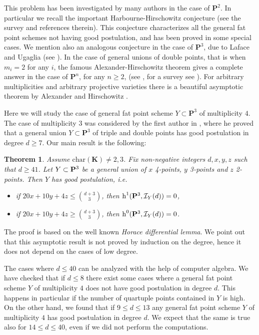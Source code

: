 \documentclass{amsart}
\theoremstyle{plain}
\newtheorem{theorem}{Theorem}
\theoremstyle{definition}
\begin{document}
This problem has been investigated by many authors in the case of ${\mathbf P}^2$.
In particular we recall the important Harbourne-Hirschowitz conjecture
(see the survey \cite{ciliberto} and references therein). This conjecture characterizes all the
general fat point schemes not having good postulation, and has been
proved in some special cases.
We mention also an analogous conjecture in the case of ${\mathbf P}^3$,
due to Laface and Ugaglia (see \cite{laface-ugaglia}).
In the case of general unions of double points, that is when $m_i=2$ for any $i$,
the famous Alexander-Hirschowitz theorem gives a
complete answer in the case of ${\mathbf P}^n$, for any $n\ge 2$,
(see  \cite{AHinv,AHjag}, for a survey see \cite{BO}).
For arbitrary multiplicities and arbitrary projective
varieties there is a beautiful asymptotic theorem by
Alexander and Hirschowitz \cite{AH}.

Here we will study the case of general fat point scheme
$Y\subset{\mathbf P}^3$ of multiplicity $4$. The case of multiplicity $3$
was considered by the first author in \cite{ballico-tripli}, where
he proved that a general union $Y \subset {\mathbf P}^3$ of triple and
double points has good postulation in degree $d\ge7$.
\newpage
Our main result is the following:

\begin{theorem}\label{i1}
Assume $\textrm{char}(\mathbf{K})\neq 2,3$.
Fix non-negative integers $d, x, y, z$ such that $d \ge 41$.
Let $Y \subset {\bf {P}}^3$
be a general union of $x$ 4-points, $y$ 3-points and $z$
2-points. Then $Y$ has good postulation, i.e.
\begin{itemize}
\item
if $20x + 10y+4z \le \binom{d+3}{3}$,
then $\operatorname{h}^1({\bf{P}}^3,\mathcal {I}_Y(d)) = 0$,
\item if $20x+10y + 4z \ge \binom{d+3}{3}$, then
$\operatorname{h}^0({\bf {P}}^3,\mathcal {I}_Y(d))= 0$.
\end{itemize}
\end{theorem}

The proof is based on the well known {\em Horace differential lemma}.
We point out that this asymptotic result is not proved by induction on the degree,
hence it does not depend on the cases of low degree.

The cases where $d\le 40$ can be analyzed with the help of
computer algebra. We have checked that if $d\le 8$ there exist some
cases where a general fat point scheme $Y$ of multiplicity $4$
does not have good postulation in degree $d$.
This happens in particular if
the number of quartuple points contained in $Y$ is high.
On the other hand, we found that if
$9\le d \le 13$ any general fat point scheme $Y$ of multiplicity $4$
has good postulation in degree $d$.
We expect that the same is true also for $14\le d\le 40$, even if
we did not perform the computations.
\end{document}
